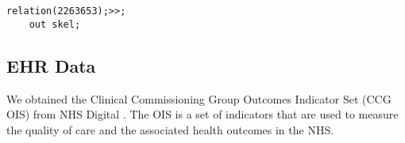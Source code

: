 \begin{lstlisting}[caption={The Overpass Turbo query that downloads the shapefile of River Thames from OpenStreetMap.}, label={overpass},captionpos=b]
    relation(2263653);>>;
    out skel;
\end{lstlisting}

\subsection{EHR Data}

We obtained the Clinical Commissioning Group Outcomes Indicator Set (CCG OIS) from NHS Digital \cite{nhsdigitalClinical}. The OIS is a set of indicators that are used to measure the quality of care and the associated health outcomes in the NHS.